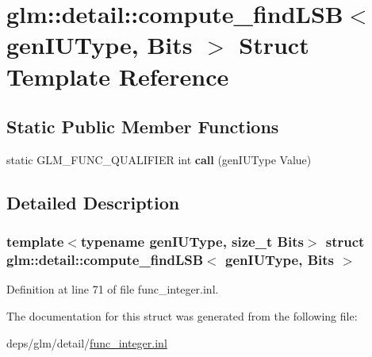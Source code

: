\hypertarget{structglm_1_1detail_1_1compute__findLSB}{}\section{glm\+:\+:detail\+:\+:compute\+\_\+find\+L\+SB$<$ gen\+I\+U\+Type, Bits $>$ Struct Template Reference}
\label{structglm_1_1detail_1_1compute__findLSB}
\subsection*{Static Public Member Functions}
\begin{DoxyCompactItemize}
\item 
\mbox{\label{structglm_1_1detail_1_1compute__findLSB_a1c0ec72e2bcf35a3109e85cfc536400b}} 
static G\+L\+M\+\_\+\+F\+U\+N\+C\+\_\+\+Q\+U\+A\+L\+I\+F\+I\+ER int {\bfseries call} (gen\+I\+U\+Type Value)
\end{DoxyCompactItemize}


\subsection{Detailed Description}
\subsubsection*{template$<$typename gen\+I\+U\+Type, size\+\_\+t Bits$>$\newline
struct glm\+::detail\+::compute\+\_\+find\+L\+S\+B$<$ gen\+I\+U\+Type, Bits $>$}



Definition at line 71 of file func\+\_\+integer.\+inl.



The documentation for this struct was generated from the following file\+:\begin{DoxyCompactItemize}
\item 
deps/glm/detail/\hyperlink{func__integer_8inl}{func\+\_\+integer.\+inl}\end{DoxyCompactItemize}
